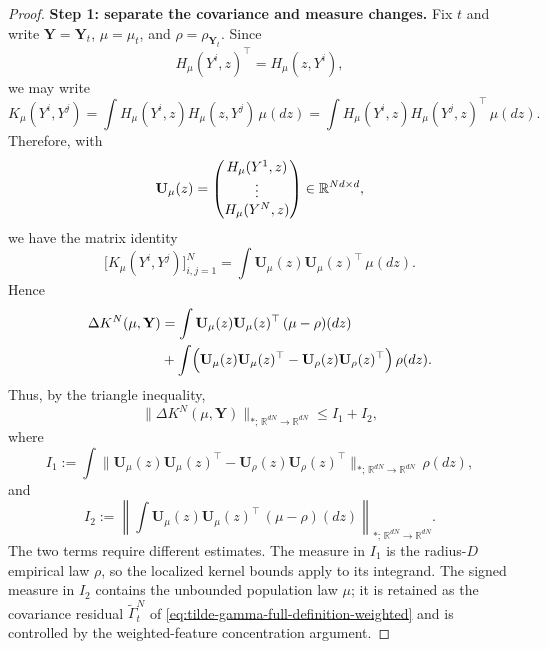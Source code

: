 \begin{proof}
\noindent\textbf{Step 1: separate the covariance and measure changes.}
Fix $t$ and write $\mathbf Y=\mathbf Y_t$, $\mu=\mu_t$, and
$\rho=\rho_{\mathbf Y_t}$. Since
\[
H_\mu(Y^i,z)^\top=H_\mu(z,Y^i),
\]
we may write
\[
K_\mu(Y^i,Y^j)
=
\int H_\mu(Y^i,z)H_\mu(z,Y^j)\,\mu(dz)
=
\int H_\mu(Y^i,z)H_\mu(Y^j,z)^\top\,\mu(dz).
\]
Therefore, with
\[
\mathbf U_\mu(z)
=
\begin{pmatrix}
H_\mu(Y^1,z)\\
\vdots\\
H_\mu(Y^N,z)
\end{pmatrix}
\in\mathbb{R}^{Nd\times d},
\]
we have the matrix identity
\[
\bigl[K_\mu(Y^i,Y^j)\bigr]_{i,j=1}^N
=
\int \mathbf U_\mu(z)\mathbf U_\mu(z)^\top\,\mu(dz).
\]
Hence
\begin{align*}
\Delta K^N(\mu,\mathbf Y)
&=
\int \mathbf U_\mu(z)\mathbf U_\mu(z)^\top\,(\mu-\rho)(dz)\\
&+
\int \Bigl(\mathbf U_\mu(z)\mathbf U_\mu(z)^\top
-
\mathbf U_\rho(z)\mathbf U_\rho(z)^\top\Bigr)\,\rho(dz).
\\
\end{align*}
Thus, by the triangle inequality,
\[
\|\Delta K^N(\mu,\mathbf Y)\|_{*;\,\mathbb R^{dN}\to\mathbb R^{dN}}
\le I_1+I_2,
\]
where
\[
I_1:=
\int
\bigl\|
\mathbf U_\mu(z)\mathbf U_\mu(z)^\top
-
\mathbf U_\rho(z)\mathbf U_\rho(z)^\top
\bigr\|_{*;\,\mathbb R^{dN}\to\mathbb R^{dN}}
\,\rho(dz),
\]
and
\[
I_2:=
\left\|
\int \mathbf U_\mu(z)\mathbf U_\mu(z)^\top\,(\mu-\rho)(dz)
\right\|_{*;\,\mathbb R^{dN}\to\mathbb R^{dN}}.
\]
The two terms require different estimates. The measure in $I_1$ is the
radius-$D$ empirical law $\rho$, so the localized kernel bounds apply to its
integrand. The signed measure in $I_2$ contains the unbounded population law
$\mu$; it is retained as the covariance residual
$\widetilde\Gamma_t^N$ of
\cref{eq:tilde-gamma-full-definition-weighted} and is controlled by the
weighted-feature concentration argument.


\end{proof}
